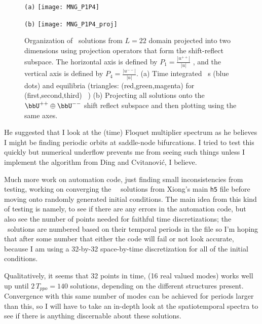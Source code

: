 \begin{itemize}
\begin{figure}
\begin{minipage}[height=.32\textheight]{.5\textwidth}
\centering \small{\texttt{(a)}}
\texttt{[image: MNG\_P1P4]}
\end{minipage}
\begin{minipage}[height=.32\textheight]{.5\textwidth}
\centering \small{\texttt{(b)}}
\texttt{[image: MNG\_P1P4\_proj]}
\end{minipage}
\caption{ \label{fig:MNGSRorganization}
Organization of \ppo\ solutions from $L=22$ domain projected into two dimensions using projection operators that form the shift-reflect subspace. The horizontal axis is defined by $P_1 = \frac{|u^{++}|}{|u|}$ , and the vertical axis
is defined by $P_4 = \frac{|u^{--}|}{|u|}$.
(a) Time integrated \ppo\ s (blue dots) and equilibria
(triangles: (red,green,magenta) for (first,second,third) \eqva\ )
(b) Projecting all solutions onto the $\bbU^{++} \oplus \bbU^{--}$ shift reflect subspace and then plotting using the same axes.
}
\end{figure}

He suggested that I look at the (time) Floquet multiplier spectrum as he believes
I might be finding periodic orbits at saddle-node bifurcations. I tried
to test this quickly but numerical underflow prevents me from seeing such
things unless I implement the algorithm from Ding and Cvitanovi{\'c},
 I believe.

Much more work on automation code, just finding small inconsistencies
from testing, working on converging the \ppo\ \twot\ solutions from
Xiong's main \texttt{h5} file before moving onto randomly generated initial
conditions. The main idea from this kind of testing is namely,
to see if there are any errors in the automation code, but also see the
number of points needed for faithful time discretizations; the \ppo\ solutions
are numbered based on their temporal periods in the file so I'm hoping that
after some number that either the code will fail or not look accurate, because
I am using a 32-by-32 space-by-time discretization for all of the initial conditions.

Qualitatively, it seems that 32 points in time, (16 real valued modes) works well
up until $2\,T_{ppo}=140$ solutions, depending on the different structures present.
Convergence with this same number of modes can be achieved for periods larger than this,
so I will have to take an in-depth look at the spatiotemporal spectra to see if there is anything
discernable about these solutions.


\end{itemize}
